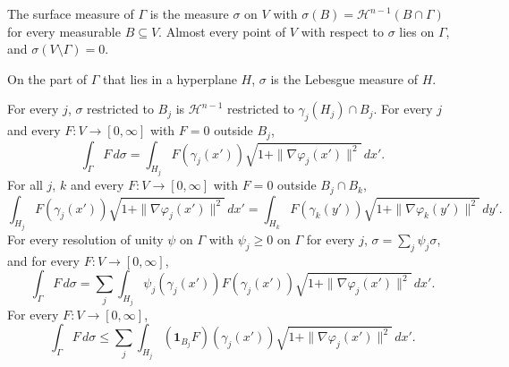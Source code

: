\begin{definition}
\label{def:surface-measure}
\leanok
{}
The surface measure of $\Gamma$ is the measure $\sigma$ on $V$ with
$\sigma(B) = \mathcal H^{n-1}(B \cap \Gamma)$ for every measurable $B \subseteq V$. Almost every
point of $V$ with respect to $\sigma$ lies on $\Gamma$, and $\sigma(V \setminus \Gamma) = 0$.
\end{definition}

On the part of $\Gamma$ that lies in a hyperplane $H$, $\sigma$ is the Lebesgue measure of $H$.

\begin{theorem}
\label{thm:surface-measure-charts}
\leanok
{}
For every $j$, $\sigma$ restricted to $B_j$ is $\mathcal H^{n-1}$ restricted to
$\gamma_j(H_j) \cap B_j$. For every $j$ and every $F : V \to [0, \infty]$ with $F = 0$ outside
$B_j$,
\[
  \int_\Gamma F \, d\sigma
  = \int_{H_j} F(\gamma_j(x')) \sqrt{1 + \|\nabla\varphi_j(x')\|^2} \, dx' .
\]
For all $j$, $k$ and every $F : V \to [0, \infty]$ with $F = 0$ outside $B_j \cap B_k$,
\[
  \int_{H_j} F(\gamma_j(x')) \sqrt{1 + \|\nabla\varphi_j(x')\|^2} \, dx'
  = \int_{H_k} F(\gamma_k(y')) \sqrt{1 + \|\nabla\varphi_k(y')\|^2} \, dy' .
\]
For every resolution of unity $\psi$ on $\Gamma$ with $\psi_j \geq 0$ on $\Gamma$ for every $j$,
$\sigma = \sum_j \psi_j \sigma$, and for every $F : V \to [0, \infty]$,
\[
  \int_\Gamma F \, d\sigma = \sum_j \int_{H_j} \psi_j(\gamma_j(x')) F(\gamma_j(x'))
  \sqrt{1 + \|\nabla\varphi_j(x')\|^2} \, dx' .
\]
For every $F : V \to [0, \infty]$,
\[
  \int_\Gamma F \, d\sigma \leq \sum_j \int_{H_j} (\mathbf 1_{B_j} F)(\gamma_j(x'))
  \sqrt{1 + \|\nabla\varphi_j(x')\|^2} \, dx' .
\]
\end{theorem}

